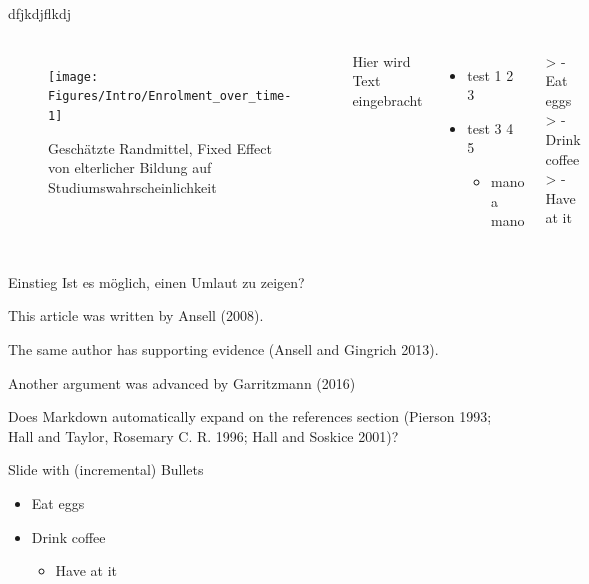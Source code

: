 \documentclass[
  ignorenonframetext,
]{beamer}
\providecommand{\tightlist}{%
  \setlength{\itemsep}{0pt}\setlength{\parskip}{0pt}}
\begin{document}
\begin{frame}{dfjkdjflkdj}
\protect\hypertarget{dfjkdjflkdj}{}
\begin{columns}
\begin{figure}
\texttt{[image: Figures/Intro/Enrolment\_over\_time-1]} \caption{Geschätzte Randmittel, Fixed Effect von elterlicher Bildung auf Studiumswahrscheinlichkeit}\label{fig:unnamed-chunk-9}
\end{figure}

Hier wird Text eingebracht \newline
\begin{itemize}[<+->]
\item{test 1 2 3}
\item{test 3 4 5}
\begin{itemize}
\item{mano a mano}
\end{itemize}
\end{itemize}

> - Eat eggs
> - Drink coffee
>    - Have at it

\end{columns}
\end{frame}

\begin{frame}{Einstieg}
\protect\hypertarget{einstieg-3}{}
Ist es möglich, einen Umlaut zu zeigen?

This article was written by Ansell (2008).

The same author has supporting evidence (Ansell and Gingrich 2013).

Another argument was advanced by Garritzmann (2016)

Does Markdown automatically expand on the references section (Pierson
1993; Hall and Taylor, Rosemary C. R. 1996; Hall and Soskice 2001)?
\end{frame}

\begin{frame}{Slide with (incremental) Bullets}
\protect\hypertarget{slide-with-incremental-bullets}{}
\begin{itemize}[<+->]
\tightlist
\item
  Eat eggs
\item
  Drink coffee

  \begin{itemize}[<+->]
  \tightlist
  \item
    Have at it
  \end{itemize}
\end{itemize}
\end{frame}
\end{document}
